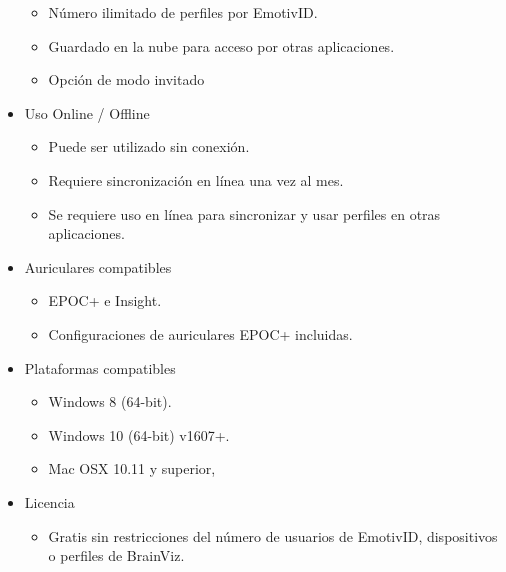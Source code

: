 \begin{itemize}
    \begin{itemize}
        \item Número ilimitado de perfiles por EmotivID.
        \item Guardado en la nube para acceso por otras aplicaciones.
        \item Opción de modo invitado
    \end{itemize}
    \item Uso Online / Offline
    \begin{itemize}
        \item Puede ser utilizado sin conexión.
        \item Requiere sincronización en línea una vez al mes.
        \item Se requiere uso en línea para sincronizar y usar perfiles en otras aplicaciones.
    \end{itemize}
    \item Auriculares compatibles
    \begin{itemize}
        \item EPOC+ e Insight.
        \item Configuraciones de auriculares EPOC+ incluidas.
    \end{itemize}
    \item Plataformas compatibles
    \begin{itemize}
        \item Windows 8 (64-bit).
        \item Windows 10 (64-bit) v1607+.
        \item Mac OSX 10.11 y superior,
    \end{itemize}
    \item Licencia
    \begin{itemize}
        \item Gratis sin restricciones del número de usuarios de EmotivID, dispositivos o perfiles de BrainViz.
    \end{itemize}
\end{itemize}


